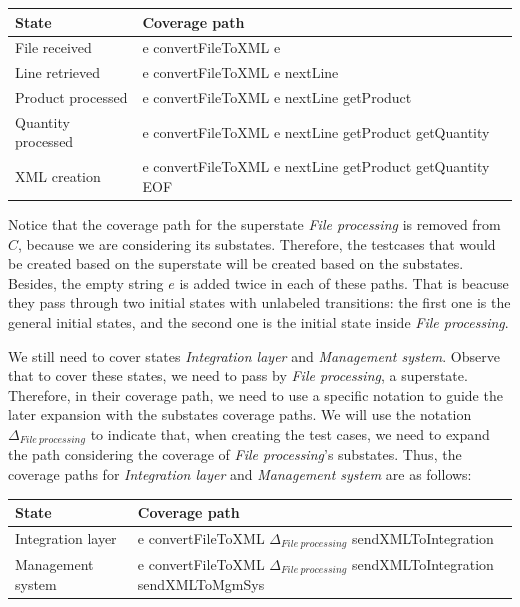 \begin{center}
\begin{tabular}{| l | l|}

\hline

State & Coverage path \\ \hline

File received & e convertFileToXML e \\ \hline

Line retrieved & e convertFileToXML e nextLine\\ \hline

Product processed & e convertFileToXML e nextLine getProduct\\ \hline

Quantity processed & e convertFileToXML e nextLine getProduct getQuantity\\ \hline

XML creation & e convertFileToXML e nextLine getProduct getQuantity EOF\\ 

\hline
\end{tabular}
\end{center}

Notice that the coverage path for the superstate \textit{File processing} is removed from $C$, because we are considering its substates. Therefore, the testcases that would be created based on the superstate will be created based on the substates. Besides, the empty string $e$ is added twice in each of these paths. That is beacuse they pass through two initial states with unlabeled transitions: the first one is the general initial states, and the second one is the initial state inside \textit{File processing}.

We still need to cover states \textit{Integration layer} and \textit{Management system}. Observe that to cover these states, we need to pass by \textit{File processing}, a superstate. Therefore, in their coverage path, we need to use a specific notation to guide the later expansion with the substates coverage paths. We will use the notation $\Delta_{File\ processing}$ to indicate that, when creating the test cases, we need to expand the path considering the coverage of \textit{File processing}'s substates. Thus, the coverage paths for \textit{Integration layer} and \textit{Management system} are as follows:

\begin{center}
\begin{tabular}{| l | p{10cm}|}

\hline

State & Coverage path \\ \hline

Integration layer & e convertFileToXML $\Delta_{File\ processing}$ sendXMLToIntegration \\ \hline

Management system & e convertFileToXML $\Delta_{File\ processing}$ sendXMLToIntegration sendXMLToMgmSys\\

\hline
\end{tabular}
\end{center}

